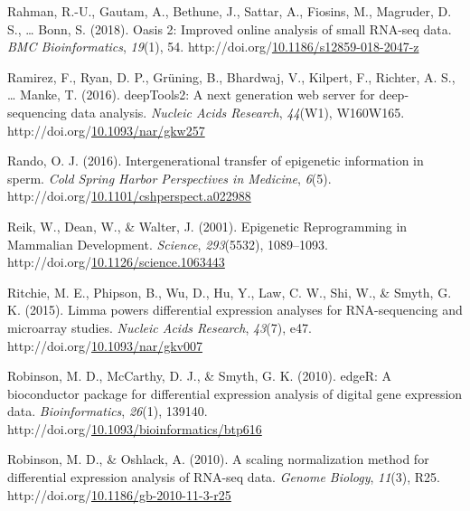 \documentclass[12pt,twoside]{reedthesis}
\newlength{\cslhangindent}
\newenvironment{CSLReferences}[2] %
 {%
  \setlength{\parindent}{0pt}
  \ifodd #1 \everypar{\setlength{\hangindent}{\cslhangindent}}\ignorespaces\fi
  \ifnum #2 > 0
  \setlength{\parskip}{#2\baselineskip}
  \fi
 }%
 {}
\begin{document}
\begin{CSLReferences}{1}{0}
\leavevmode{}%
Rahman, R.-U., Gautam, A., Bethune, J., Sattar, A., Fiosins, M., Magruder, D. S., \ldots{} Bonn, S. (2018). Oasis 2: Improved online analysis of small RNA-seq data. \emph{BMC Bioinformatics}, \emph{19}(1), 54. http://doi.org/\href{https://doi.org/10.1186/s12859-018-2047-z}{10.1186/s12859-018-2047-z}

\leavevmode{}%
Ramirez, F., Ryan, D. P., Grüning, B., Bhardwaj, V., Kilpert, F., Richter, A. S., \ldots{} Manke, T. (2016). deepTools2: A next generation web server for deep-sequencing data analysis. \emph{Nucleic Acids Research}, \emph{44}(W1), W160W165. http://doi.org/\href{https://doi.org/10.1093/nar/gkw257}{10.1093/nar/gkw257}

\leavevmode{}%
Rando, O. J. (2016). Intergenerational transfer of epigenetic information in sperm. \emph{Cold Spring Harbor Perspectives in Medicine}, \emph{6}(5). http://doi.org/\href{https://doi.org/10.1101/cshperspect.a022988}{10.1101/cshperspect.a022988}

\leavevmode{}%
Reik, W., Dean, W., \& Walter, J. (2001). Epigenetic Reprogramming in Mammalian Development. \emph{Science}, \emph{293}(5532), 1089--1093. http://doi.org/\href{https://doi.org/10.1126/science.1063443}{10.1126/science.1063443}

\leavevmode{}%
Ritchie, M. E., Phipson, B., Wu, D., Hu, Y., Law, C. W., Shi, W., \& Smyth, G. K. (2015). Limma powers differential expression analyses for RNA-sequencing and microarray studies. \emph{Nucleic Acids Research}, \emph{43}(7), e47. http://doi.org/\href{https://doi.org/10.1093/nar/gkv007}{10.1093/nar/gkv007}

\leavevmode{}%
Robinson, M. D., McCarthy, D. J., \& Smyth, G. K. (2010). edgeR: A bioconductor package for differential expression analysis of digital gene expression data. \emph{Bioinformatics}, \emph{26}(1), 139140. http://doi.org/\href{https://doi.org/10.1093/bioinformatics/btp616}{10.1093/bioinformatics/btp616}

\leavevmode{}%
Robinson, M. D., \& Oshlack, A. (2010). A scaling normalization method for differential expression analysis of RNA-seq data. \emph{Genome Biology}, \emph{11}(3), R25. http://doi.org/\href{https://doi.org/10.1186/gb-2010-11-3-r25}{10.1186/gb-2010-11-3-r25}


\end{CSLReferences}
\end{document}
